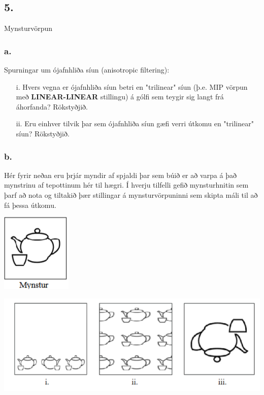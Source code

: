 \documentclass{article}
\begin{document}
\newpage

\subsection{5.} Mynsturvörpun

\subsubsection{a.}Spurningar um ójafnhliða síun (anisotropic filtering):

\begin{itemize}
    \item[i.]Hvers vegna er ójafnhliða síun betri en "trilinear" síun (þ.e. MIP vörpun
    með \textbf{LINEAR-LINEAR} stillingu) á gólfi sem teygir sig langt frá áhorfanda?
    Rökstyðjið.
    \item[ii.]Eru einhver tilvik þar sem ójafnhliða síun gæfi verri útkomu en "trilinear"
    síun? Rökstyðjið.
\end{itemize}

\subsubsection{b.}Hér fyrir neðan eru þrjár myndir af spjaldi þar sem búið er að
varpa á það mynstrinu af tepottinum hér til hægri. Í hverju
tilfelli gefið mynsturhnitin sem þarf að nota og tiltakið þær
stillingar á mynsturvörpuninni sem skipta máli til að fá þessa
útkomu.

\includegraphics[scale = 0.9]{myndir/mynstur.png}

\begin{center}
\includegraphics[scale = 0.9]{myndir/mynstur2.png}
\end{center}
\end{document}
